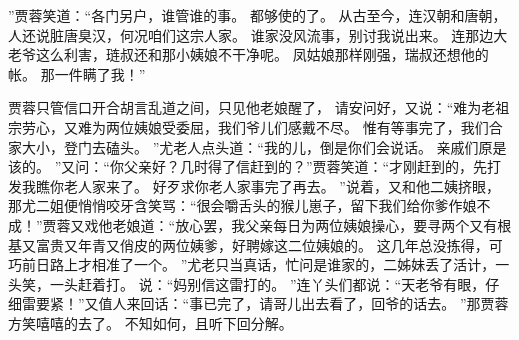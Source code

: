 ”贾蓉笑道：“各门另户，谁管谁的事。
都够使的了。
从古至今，连汉朝和唐朝，人还说脏唐臭汉，何况咱们这宗人家。
谁家没风流事，别讨我说出来。
连那边大老爷这么利害，琏叔还和那小姨娘不干净呢。
凤姑娘那样刚强，瑞叔还想他的帐。
那一件瞒了我！”\par
贾蓉只管信口开合胡言乱道之间，只见他老娘醒了，
请安问好，又说：“难为老祖宗劳心，又难为两位姨娘受委屈，我们爷儿们感戴不尽。
惟有等事完了，我们合家大小，登门去磕头。
”尤老人点头道：“我的儿，倒是你们会说话。
亲戚们原是该的。
”又问：“你父亲好？几时得了信赶到的？”贾蓉笑道：“才刚赶到的，先打发我瞧你老人家来了。
好歹求你老人家事完了再去。
”说着，又和他二姨挤眼，那尤二姐便悄悄咬牙含笑骂：“很会嚼舌头的猴儿崽子，留下我们给你爹作娘不成！”贾蓉又戏他老娘道：“放心罢，我父亲每日为两位姨娘操心，要寻两个又有根基又富贵又年青又俏皮的两位姨爹，好聘嫁这二位姨娘的。
这几年总没拣得，可巧前日路上才相准了一个。
”尤老只当真话，忙问是谁家的，二姊妹丢了活计，一头笑，一头赶着打。
说：“妈别信这雷打的。
”连丫头们都说：“天老爷有眼，仔细雷要紧！”又值人来回话：“事已完了，请哥儿出去看了，回爷的话去。
”那贾蓉方笑嘻嘻的去了。
不知如何，且听下回分解。
\par
{}
